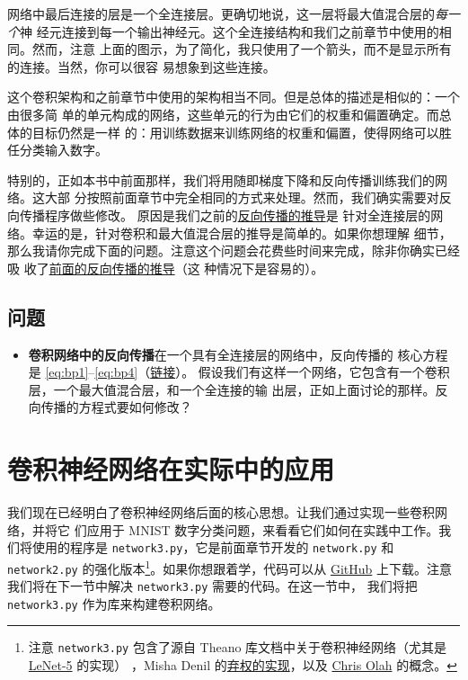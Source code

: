 网络中最后连接的层是一个全连接层。更确切地说，这一层将最大值混合层的\emph{每一个}神
经元连接到每一个输出神经元。这个全连接结构和我们之前章节中使用的相同。然而，注意
上面的图示，为了简化，我只使用了一个箭头，而不是显示所有的连接。当然，你可以很容
易想象到这些连接。

这个卷积架构和之前章节中使用的架构相当不同。但是总体的描述是相似的：一个由很多简
单的单元构成的网络，这些单元的行为由它们的权重和偏置确定。而总体的目标仍然是一样
的：用训练数据来训练网络的权重和偏置，使得网络可以胜任分类输入数字。

特别的，正如本书中前面那样，我们将用随即梯度下降和反向传播训练我们的网络。这大部
分按照前面章节中完全相同的方式来处理。然而，我们确实需要对反向传播程序做些修改。
原因是我们之前的\hyperref[ch:HowThebackpropagationalgorithmworks]{反向传播的推导}是
针对全连接层的网络。幸运的是，针对卷积和最大值混合层的推导是简单的。如果你想理解
细节，那么我请你完成下面的问题。注意这个问题会花费些时间来完成，除非你确实已经吸
收了\hyperref[ch:HowThebackpropagationalgorithmworks]{前面的反向传播的推导}（这
  种情况下是容易的）。

\subsection*{问题}

\begin{itemize}
\item \textbf{卷积网络中的反向传播}\quad 在一个具有全连接层的网络中，反向传播的
  核心方程是 \eqref{eq:bp1}--\eqref{eq:bp4}（\hyperref[backpropsummary]{链接}）。
  假设我们有这样一个网络，它包含有一个卷积层，一个最大值混合层，和一个全连接的输
  出层，正如上面讨论的那样。反向传播的方程式要如何修改？
\end{itemize}

\section{卷积神经网络在实际中的应用}
\label{seq:convolutional_neural_networks_in_practice}

我们现在已经明白了卷积神经网络后面的核心思想。让我们通过实现一些卷积网络，并将它
们应用于 MNIST 数字分类问题，来看看它们如何在实践中工作。我们将使用的程序是
\lstinline!network3.py!，它是前面章节开发的 \lstinline!network.py! 和
\lstinline!network2.py! 的强化版本\footnote{注意 \lstinline!network3.py!
  包含了源自 Theano 库文档中关于卷积神经网络（尤其是 \href{http://deeplearning.net/tutorial/lenet.html}{LeNet-5} 的实现）
	，Misha Denil 的\href{https://github.com/mdenil/dropout}{弃权的实现}，以及
	\href{http://colah.github.io/}{Chris Olah} 的概念。}。如果你想跟着学，代码可以从
\href{https://github.com/mnielsen/neural-networks-and-deep-learning/blob/master/src/network3.py}{GitHub}
上下载。注意我们将在下一节中解决 \lstinline!network3.py! 需要的代码。在这一节中，
我们将把 \lstinline!network3.py! 作为库来构建卷积网络。


